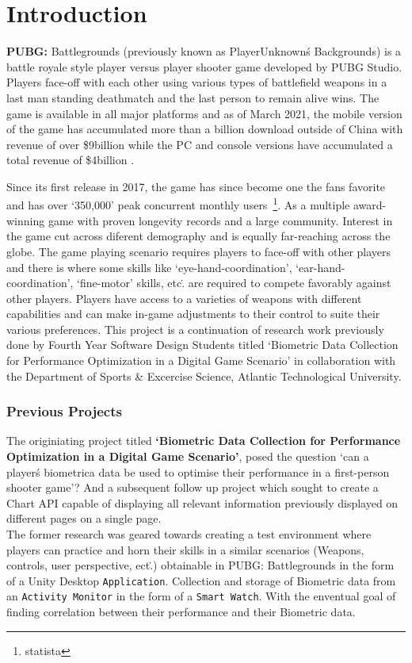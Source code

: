 \chapter{Introduction}

\textbf{PUBG:} Battlegrounds (previously known as PlayerUnknown\'s Backgrounds) is a battle royale style player versus
    player shooter game developed by PUBG Studio. Players face-off with each other using various types of battlefield weapons
    in a last man standing deathmatch and the last person to remain alive wins. The game is available in all major platforms
    and as of March 2021, the mobile version of the game has accumulated more than a billion download outside of China with 
    revenue of over \$9billion while the PC and console versions have accumulated a total revenue of \$4billion
    \cite{statista}.
    \par 
    Since its first release in 2017, the game has since become one the fans favorite and has over `350,000' peak concurrent 
    monthly users~\footnote{statista}. As a multiple award-winning game with proven longevity records and a large community.
    Interest in the game cut across diferent demography and is equally far-reaching across the globe. 
    The game playing scenario requires players to face-off with other players and there is where some skills like 
    `eye-hand-coordination', `ear-hand-coordination', `fine-motor' skills, etc\.. are required to compete favorably against 
    other players. Players have access to a varieties of weapons with different capabilities and can make in-game adjustments
    to their control to suite their various preferences. 
    This project is a continuation of research work previously done by Fourth Year Software Design Students titled `Biometric 
    Data Collection for Performance Optimization in a Digital Game Scenario' in collaboration with the Department of Sports
     \& Excercise Science, Atlantic Technological University.
    \subsection*{Previous Projects}
    The originiating project titled \textbf{`Biometric Data Collection for Performance Optimization in a Digital
    Game Scenario'}, posed the question `can a player\'s biometrica data be used to optimise their performance in a 
    first-person shooter game'? And a subsequent follow up project which sought to create a Chart API capable of displaying 
    all relevant information previously displayed on different pages on a single page.\\
    The former research was geared towards creating a test environment where players can 
    practice and horn their skills in a similar scenarios (Weapons, controls, user perspective, ect\..) obtainable in PUBG\:: 
    Battlegrounds in the form of a Unity Desktop {\tt Application}. Collection and storage of Biometric data from an 
    {\tt Activity Monitor} in the form of a {\tt Smart Watch}. With the enventual goal of finding correlation between their
    performance and their Biometric data. 
    

